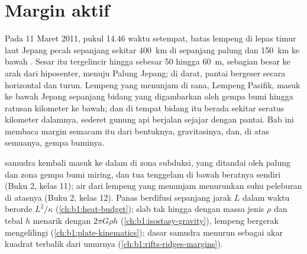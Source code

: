 \chapter{Margin aktif}\label{ch:b1:active-margins}

Pada 11 Maret 2011, pukul 14.46 waktu setempat, batas lempeng di lepas timur laut Jepang pecah sepanjang sekitar \qty{400}{km} di sepanjang palung dan \qty{150}{km} ke bawah . Sesar itu tergelincir hingga sebesar 50 hingga \qty{60}{m}, sebagian besar ke arah  dari hiposenter, menuju Palung Jepang; di darat, pantai bergeser secara horizontal dan turun. Lempeng yang menunjam di sana, Lempeng Pasifik, masuk ke bawah Jepang sepanjang bidang yang digambarkan oleh gempa bumi hingga ratusan kilometer ke bawah; dan di tempat bidang itu berada sekitar seratus kilometer dalamnya, sederet gunung api berjalan sejajar dengan pantai. Bab ini membaca margin semacam itu dari bentuknya, gravitasinya,  dan, di atas semuanya, gempa buminya.

\begin{recall}
 samudra kembali masuk ke dalam  di zona subduksi, yang ditandai oleh palung dan zona gempa bumi miring, dan  tua tenggelam di bawah beratnya sendiri (Buku 2, kelas 11); air dari lempeng yang menunjam menurunkan suhu peleburan  di atasnya (Buku 2, kelas 12). Panas berdifusi sepanjang jarak $L$ dalam waktu berorde $L^2/\kappa$ (\cref{ch:b1:heat-budget}); slab tak hingga dengan massa jenis $\rho$ dan tebal $h$ menarik dengan $2\pi G\rho h$ (\cref{ch:b1:isostasy-gravity}), lempeng bergerak mengelilingi  (\cref{ch:b1:plate-kinematics});  dasar samudra menurun sebagai akar kuadrat terbalik dari umurnya (\cref{ch:b1:rifts-ridges-margins}).
\end{recall}

